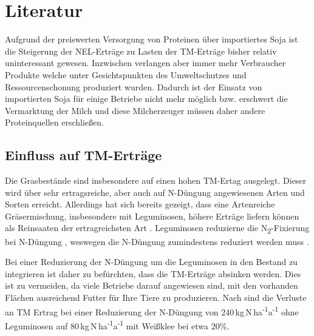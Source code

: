 
\section{Literatur}
\label{sec:Literatur}

Aufgrund der preiswerten Versorgung von Proteinen über importiertes Soja ist die Steigerung der \ac{NEL}-Erträge zu Lasten der \ac{TM}-Erträge bisher relativ uninteressant gewesen.
Inzwischen verlangen aber immer mehr Verbraucher Produkte welche unter Gesichtspunkten des Umweltschutzes und Ressourcenschonung produziert wurden.
Dadurch ist der Einsatz von importierten Soja für einige Betriebe nicht mehr möglich bzw. erschwert die Vermarktung der Milch und diese Milcherzeuger müssen daher andere Proteinquellen erschließen.

\subsection{Einfluss auf \acl{TM}-Erträge}
\label{subsec:TM}

Die Grasbestände sind insbesondere auf einen hohen \ac{TM}-Ertag ausgelegt.
Dieser wird über sehr ertragsreiche, aber auch auf N-Düngung angewiesenen Arten und Sorten erreicht.
Allerdings hat sich bereits gezeigt, dass eine Artenreiche Gräsermischung, insbesondere mit Leguminosen, höhere Erträge liefern können als Reinsaaten der ertragreichsten Art \parencite{nyfeler2009strong}.
Leguminosen reduzierne die N\textsubscript{2}-Fixierung bei N-Düngung \parencite{ledgard2001nitrogen}, weswegen die N-Düngung zumindestens reduziert werden muss \parencite[34]{weggler2050leguminosen}.

Bei einer Reduzierung der N-Düngung um die Leguminosen in den Bestand zu integrieren ist daher zu befürchten, dass die \ac{TM}-Erträge absinken werden.
Dies ist zu vermeiden, da viele Betriebe darauf angewiesen sind, mit den vorhanden Flächen ausreichend Futter für Ihre Tiere zu produzieren.
Nach \textcite[11]{engel2013protein} sind die Verluste an \ac{TM} Ertrag bei einer Reduzierung der N-Düngung von  240\,kg\,N\,ha\textsuperscript{-1}a\textsuperscript{-1} ohne Leguminosen auf 80\,kg\,N\,ha\textsuperscript{-1}a\textsuperscript{-1} mit Weißklee bei etwa 20\%.


